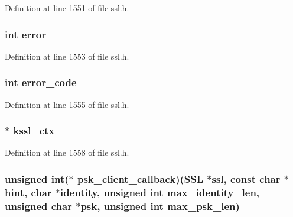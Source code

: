 Definition at line 1551 of file ssl.\+h.

\subsubsection[{\texorpdfstring{error}{error}}]{\setlength{\rightskip}{0pt plus 5cm}int error}\hypertarget{structssl__st_a11614f44ef4d939bdd984953346a7572}{}\label{structssl__st_a11614f44ef4d939bdd984953346a7572}


Definition at line 1553 of file ssl.\+h.

\subsubsection[{\texorpdfstring{error\+\_\+code}{error_code}}]{\setlength{\rightskip}{0pt plus 5cm}int error\+\_\+code}\hypertarget{structssl__st_a7d16b1c68c87cec009d972e79abfba78}{}\label{structssl__st_a7d16b1c68c87cec009d972e79abfba78}


Definition at line 1555 of file ssl.\+h.

\subsubsection[{\texorpdfstring{kssl\+\_\+ctx}{kssl_ctx}}]{ $\ast$ kssl\+\_\+ctx}\hypertarget{structssl__st_a87b1b8010d19c39d5f20a64a3ca66d55}{}\label{structssl__st_a87b1b8010d19c39d5f20a64a3ca66d55}


Definition at line 1558 of file ssl.\+h.

\subsubsection[{\texorpdfstring{psk\+\_\+client\+\_\+callback}{psk_client_callback}}]{\setlength{\rightskip}{0pt plus 5cm}unsigned int($\ast$ psk\+\_\+client\+\_\+callback)({\bf S\+SL} $\ast$ssl, const char $\ast$hint, char $\ast$identity, unsigned int max\+\_\+identity\+\_\+len, unsigned char $\ast$psk, unsigned int max\+\_\+psk\+\_\+len)}\hypertarget{structssl__st_a71fd3455fac589a1f9bdc9f8520aa4e5}{}\label{structssl__st_a71fd3455fac589a1f9bdc9f8520aa4e5}


